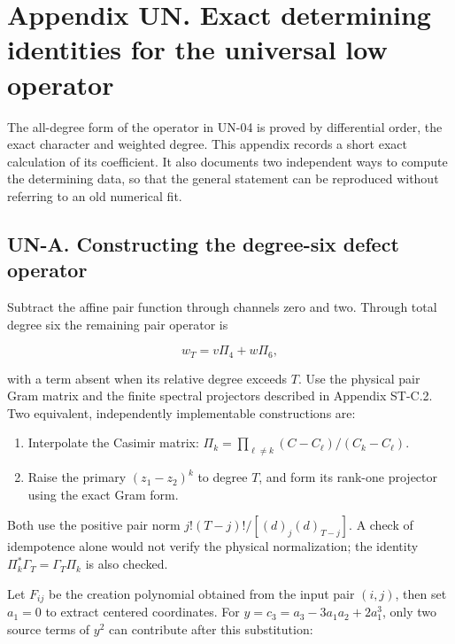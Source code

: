 \documentclass[a4paper,11pt]{article}
\numberwithin{equation}{section}
\providecommand{\tightlist}{\setlength{\itemsep}{0pt}\setlength{\parskip}{0pt}}
\begin{document}
\clearpage
\hypertarget{appendix-un.-exact-determining-identities-for-the-universal-low-operator}{%
\section{Appendix UN. Exact determining identities for the universal low operator}\label{appendix-un.-exact-determining-identities-for-the-universal-low-operator}}

The all-degree form of the operator in UN-04 is proved by differential order, the exact character and weighted degree. This appendix records a short exact calculation of its coefficient. It also documents two independent ways to compute the determining data, so that the general statement can be reproduced without referring to an old numerical fit.

\hypertarget{un-a.-constructing-the-degree-six-defect-operator}{%
\subsection{UN-A. Constructing the degree-six defect operator}\label{un-a.-constructing-the-degree-six-defect-operator}}

Subtract the affine pair function through channels zero and two. Through total degree six the remaining pair operator is

\[
w_T=v\Pi_4+w\Pi_6,
\]

with a term absent when its relative degree exceeds \(T\). Use the physical pair Gram matrix and the finite spectral projectors described in Appendix ST-C.2. Two equivalent, independently implementable constructions are:

\begin{enumerate}
\def\labelenumi{\arabic{enumi}.}
\tightlist
\item
  Interpolate the Casimir matrix: \(\Pi_k=\prod_{\ell\ne k}(C-C_\ell)/(C_k-C_\ell)\).
\item
  Raise the primary \((z_1-z_2)^k\) to degree \(T\), and form its rank-one projector using the exact Gram form.
\end{enumerate}

Both use the positive pair norm \(j!(T-j)!/[(d)_j(d)_{T-j}]\). A check of idempotence alone would not verify the physical normalization; the identity \(\Pi_k^*\Gamma_T=\Gamma_T\Pi_k\) is also checked.

Let \(F_{ij}\) be the creation polynomial obtained from the input pair \((i,j)\), then set \(a_1=0\) to extract centered coordinates. For \(y=c_3=a_3-3a_1a_2+2a_1^3\), only two source terms of \(y^2\) can contribute after this substitution:
\end{document}

